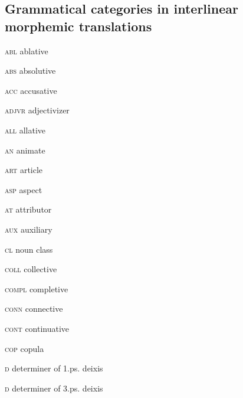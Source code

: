 \begin{refsection}

%
%
%
%	
%	
%	
%	
%	
%	
%	
%	
%	
%	
%	
%	
%	
%	
%	
%	
%	
%	
%	
%	
%	
%	
%	
%	
%	
%	

\section*{Grammatical categories in interlinear morphemic translations}

\begin{multicols}{2}
\setlength{\parindent}{0pt}\textsc{abl}  ablative
	
	\textsc{abs}  absolutive
	
	\textsc{acc}  accusative
	
	\textsc{adjvr}  adjectivizer
	
	\textsc{all}  allative
	
	\textsc{an}  animate
	
	\textsc{art}  article
	
	\textsc{asp}  aspect
	
	\textsc{at}  attributor
	
	\textsc{aux}  auxiliary
	
	\textsc{cl}  noun class
	
	\textsc{coll}  collective
	
	\textsc{compl}  completive
	
	\textsc{conn}  connective
	
	\textsc{cont}  continuative
	
	\textsc{cop}  copula
	
	\textsc{d}  determiner of 1.ps. deixis
	
	\textsc{d}  determiner of 3.ps. deixis
	

\end{multicols}
\end{refsection}
